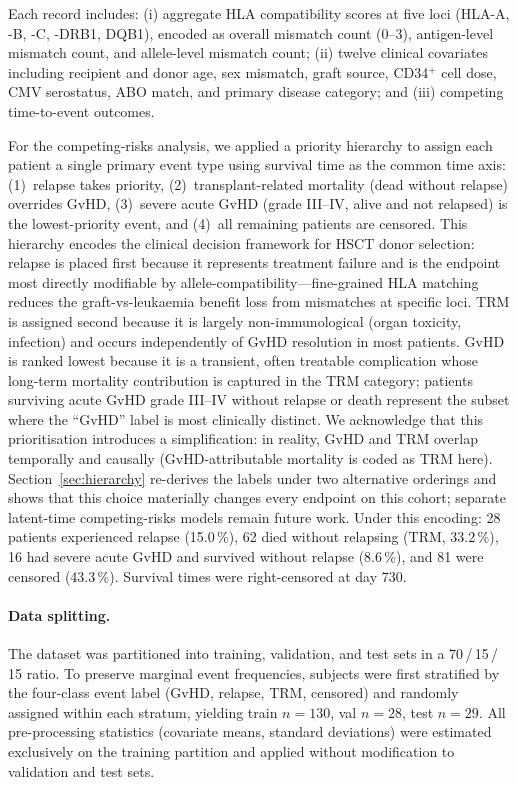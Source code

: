 \documentclass[11pt,a4paper]{article}
\begin{document}
Each record includes: (i) aggregate HLA compatibility scores at five loci
(HLA-A, -B, -C, -DRB1, DQB1), encoded as overall mismatch count
(0--3), antigen-level mismatch count, and allele-level mismatch count;
(ii) twelve clinical covariates including recipient and donor age, sex
mismatch, graft source, CD34$^+$ cell dose, CMV serostatus, ABO match, and
primary disease category; and (iii) competing time-to-event outcomes.

For the competing-risks analysis, we applied a priority hierarchy to assign
each patient a single primary event type using survival time as the common
time axis: (1)~relapse takes priority, (2)~transplant-related mortality
(dead without relapse) overrides GvHD, (3)~severe acute GvHD (grade III--IV,
alive and not relapsed) is the lowest-priority event, and (4)~all remaining
patients are censored.  This hierarchy encodes the clinical decision framework
for HSCT donor selection: relapse is placed first because it represents
treatment failure and is the endpoint most directly modifiable by
allele-compatibility---fine-grained HLA matching reduces the graft-vs-leukaemia
benefit loss from mismatches at specific loci.  TRM is assigned second because
it is largely non-immunological (organ toxicity, infection) and occurs
independently of GvHD resolution in most patients.  GvHD is ranked lowest
because it is a transient, often treatable complication whose long-term
mortality contribution is captured in the TRM category; patients surviving
acute GvHD grade III--IV without relapse or death represent the subset where
the ``GvHD'' label is most clinically distinct.  We acknowledge that this
prioritisation introduces a simplification: in reality, GvHD and TRM overlap
temporally and causally (GvHD-attributable mortality is coded as TRM here).
Section~\ref{sec:hierarchy} re-derives the labels under two alternative
orderings and shows that this choice materially changes every endpoint on this
cohort; separate latent-time competing-risks models remain future work.  Under this encoding: 28 patients experienced relapse
(15.0\,\%), 62 died without relapsing (TRM, 33.2\,\%), 16 had severe acute
GvHD and survived without relapse (8.6\,\%), and 81 were censored (43.3\,\%).
Survival times were right-censored at day 730.

\paragraph{Data splitting.}
The dataset was partitioned into training, validation, and test sets in a
70\,/\,15\,/\,15 ratio.  To preserve marginal event frequencies, subjects
were first stratified by the four-class event label (GvHD, relapse, TRM,
censored) and randomly assigned within each stratum, yielding train $n=130$,
val $n=28$, test $n=29$.  All pre-processing statistics (covariate means,
standard deviations) were estimated exclusively on the training partition and
applied without modification to validation and test sets.
\end{document}
